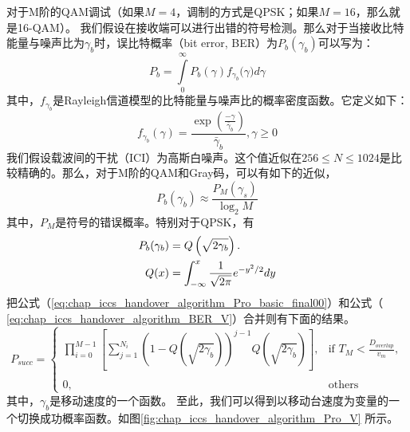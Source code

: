 对于M阶的QAM调试（如果$M=4$，调制的方式是QPSK；如果$M=16$，那么就是16-QAM）。
我们假设在接收端可以进行出错的符号检测。那么对于当接收比特能量与噪声比为$\gamma_b$时，误比特概率（bit error, BER）为$P_b(\gamma_b)$可以写为：
\[
{{P}_{b}}=\int\limits_{0}^{\infty }{{{P}_{b}}(\gamma ){{f}_{{{\gamma }_{b}}}}(}\gamma )d\gamma
\]
其中，$f_{\gamma_b}$是Rayleigh信道模型的比特能量与噪声比的概率密度函数。它定义如下：
\[{{f}_{{{\gamma }_{b}}}}(\gamma )=\frac{\exp (\frac{-\gamma }{{{{\bar{\gamma }}}_{b}}})}{{{{\bar{\gamma }}}_{b}}},\gamma \ge 0\]
我们假设载波间的干扰（ICI）为高斯白噪声。这个值近似在$256 \le N \le 1024$是比较精确的\cite{Leung:WCNC2005}。那么，对于M阶的QAM和Gray码，可以有如下的近似，
\begin{equation}
P_b(\gamma_b) \approx \frac{P_M(\gamma_s)}{\log_2 M}
\end{equation}
其中，$P_M$是符号的错误概率。特别对于QPSK，有
\begin{align}
\label{eq:chap_iccs_handover_algorithm_BER_V}
P_{b}(\gamma_{b})&= Q\left(\sqrt{2\gamma_{b}}\right).\\
Q(x) &= \int^x_{-\infty} \frac{1}{\sqrt{2\pi}}e^{-y^2/2}dy \notag
\end{align}
把公式（\ref{eq:chap_iccs_handover_algorithm_Pro_basic_final00}）和公式（ \ref{eq:chap_iccs_handover_algorithm_BER_V}）合并则有下面的结果。
\begin{equation}
P_{succ}=\left\{
\begin{array}{ll}
\prod_{i=0}^{M-1}\left[\sum_{j=1}^{N_{i}}(1-Q\left(\sqrt{2\gamma_{b}}\right))^{j-1}Q\left(\sqrt{2\gamma_{b}}\right)\right],
& \mbox{if }T_{M}<\frac{D_{overlap}}{v_{m}},\\
\\0, & \mbox{others}
\end{array}\right.\label{eq:chap_handover:velocity_bit_error_rate}
\end{equation}
其中，$\gamma_b$是移动速度的一个函数。
至此，我们可以得到以移动台速度为变量的一个切换成功概率函数。如图\ref{fig:chap_iccs_handover_algorithm_Pro_V} 所示。
